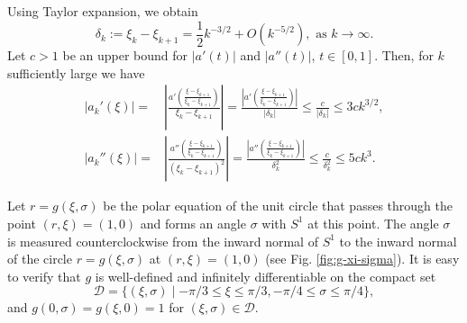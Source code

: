 \documentclass[12pt]{article}
\begin{document}
Using Taylor expansion, we obtain  
\begin{equation}\label{eq:delta-k}
  \delta_k := \xi_k - \xi_{k+1} = \frac{1}{2} k^{-3/2} + O(k^{-5/2}),  \text{ as } k \to \infty.
\end{equation}
Let $c>1$ be an upper bound for $|a'(t)|$ and $|a''(t)|$, $t \in [0,1]$. Then, for $k$ sufficiently large we have  
\begin{align}\label{eq:akp}
|a_k'(\xi)| 
=& \left|
\frac{a'\left(\frac{\xi - \xi_{k+1}}{\xi_k - \xi_{k+1}}\right)}{\xi_k - \xi_{k+1}} 
\right| 
= \frac{\left| a'\left(\frac{\xi - \xi_{k+1}}{\xi_k - \xi_{k+1}}\right)\right| }
{|\delta_k|}
\leq \frac{c}{|\delta_k|} \leq 3 c k^{3/2}, \\
\label{eq:akpp}
|a_k''(\xi)| 
=& \left|
\frac{a''\left(\frac{\xi - \xi_{k+1}}{\xi_k - \xi_{k+1}}\right)}{\left(\xi_k - \xi_{k+1}\right)^2} 
\right|
= \frac{\left| a''\left(\frac{\xi - \xi_{k+1}}{ \xi_k - \xi_{k+1}}\right)\right| }{\delta_k^2}
\leq \frac{c}{\delta_k^2} \leq 5 c k^{3}.
\end{align}

Let $r = g(\xi, \sigma)$ be the polar equation 
of the unit circle that passes through the point $(r, \xi) = (1, 0)$ and forms an angle $\sigma$ with $S^1$ at this point.
The angle $\sigma$ is measured counterclockwise from the inward normal of $S^1$ to the inward normal of the circle $r = g(\xi, \sigma)$ at $(r, \xi) = (1, 0)$ (see Fig. \ref{fig:g-xi-sigma}).
It is easy to verify that $g$ is well-defined and infinitely differentiable on the compact set
$$
\mathcal{D} = \{(\xi, \sigma) \mid -\pi/3 \leq \xi \leq \pi/3, -\pi/4 \leq \sigma \leq \pi/4\},
$$
and $g(0, \sigma) = g(\xi, 0)=1 $ for $(\xi, \sigma) \in \mathcal{D}$.
\end{document}
